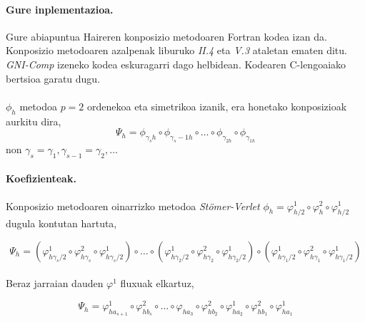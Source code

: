 \paragraph*{\textbf{Gure inplementazioa.}} Gure abiapuntua Haireren konposizio metodoaren Fortran kodea izan da. Konposizio metodoaren azalpenak liburuko \cite{Hairer2006}  \emph{II.4} eta \emph{V.3} ataletan ematen ditu. \emph{GNI-Comp} izeneko kodea eskuragarri dago \cite{HairerGniComp} helbidean. Kodearen C-lengoaiako bertsioa garatu dugu.

\paragraph*{}$\phi_h$ metodoa $p=2$ ordenekoa eta simetrikoa izanik, era honetako konposizioak aurkitu dira,
\begin{equation}
\Psi_h=\phi_{\gamma_s h} \circ \phi_{\gamma_s-1 h} \circ \dots \circ \phi_{\gamma_{2 h}} \circ \phi_{\gamma_{1 h}} 
\end{equation}
non $\gamma_s=\gamma_1, \gamma_{s-1}=\gamma_2,\dots$ 


\paragraph*{\textbf{Koefizienteak}.}

Konposizio metodoaren oinarrizko metodoa \emph{Stömer-Verlet}  $\phi_h=\varphi_{h/2}^{1} \circ \varphi_{h}^{2} \circ \varphi_{h/2}^{1}$  dugula kontutan hartuta,

\begin{equation*}
\Psi_h=(\varphi_{h \gamma_s/2}^{1} \circ \varphi_{h \gamma_s}^{2} \circ \varphi_{h \gamma_s/2}^{1}) \circ \dots 
       \circ
       (\varphi_{h \gamma_2/2}^{1} \circ \varphi_{h \gamma_2}^{2} \circ \varphi_{h \gamma_2/2}^{1}) 
       \circ
       (\varphi_{h \gamma_1/2}^{1} \circ \varphi_{h \gamma_1}^{2} \circ \varphi_{h \gamma_1/2}^{1})  
\end{equation*}

\paragraph*{}Beraz jarraian dauden $\varphi^1$ fluxuak elkartuz,

\begin{equation*}
\Psi_h=\varphi_{h a_{s+1}}^{1} \circ \varphi_{h b_s}^{2} \circ \dots 
       \circ
       \varphi_{h a_3} \circ \varphi_{h b_2}^{2} 
       \circ
       \varphi_{h a_2}^{1} \circ \varphi_{h b_1}^{2} \circ \varphi_{h a_1}^{1}  
\end{equation*}

